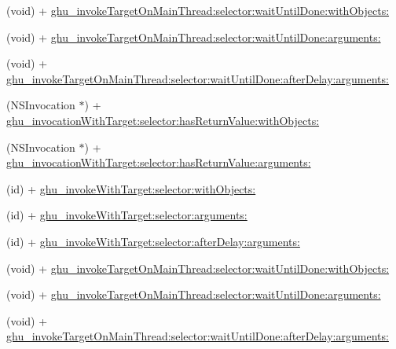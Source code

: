 \begin{DoxyCompactItemize}
(void) + \hyperlink{interface_n_s_invocation_07_g_h_utils___g_h_u_n_i_t_08_a6933a1f0fd7d0d4b8f133baf53f30a31}{ghu\-\_\-invoke\-Target\-On\-Main\-Thread\-:selector\-:wait\-Until\-Done\-:with\-Objects\-:}
\item 
(void) + \hyperlink{interface_n_s_invocation_07_g_h_utils___g_h_u_n_i_t_08_a261cd5aa6061478716fba4f79cb4f69b}{ghu\-\_\-invoke\-Target\-On\-Main\-Thread\-:selector\-:wait\-Until\-Done\-:arguments\-:}
\item 
(void) + \hyperlink{interface_n_s_invocation_07_g_h_utils___g_h_u_n_i_t_08_a0b891f27c084f6677907e0f907caf5f9}{ghu\-\_\-invoke\-Target\-On\-Main\-Thread\-:selector\-:wait\-Until\-Done\-:after\-Delay\-:arguments\-:}
\item 
(\-N\-S\-Invocation $\ast$) + \hyperlink{interface_n_s_invocation_07_g_h_utils___g_h_u_n_i_t_08_a31d3598ec7e21face3cb783c2c60b42c}{ghu\-\_\-invocation\-With\-Target\-:selector\-:has\-Return\-Value\-:with\-Objects\-:}
\item 
(\-N\-S\-Invocation $\ast$) + \hyperlink{interface_n_s_invocation_07_g_h_utils___g_h_u_n_i_t_08_a64dcd5d1f117118b02213db0846092d9}{ghu\-\_\-invocation\-With\-Target\-:selector\-:has\-Return\-Value\-:arguments\-:}
\item 
(id) + \hyperlink{interface_n_s_invocation_07_g_h_utils___g_h_u_n_i_t_08_af60de644c62297e237a21adf2ea75e80}{ghu\-\_\-invoke\-With\-Target\-:selector\-:with\-Objects\-:}
\item 
(id) + \hyperlink{interface_n_s_invocation_07_g_h_utils___g_h_u_n_i_t_08_a0aa9a0433b00c60a8174c7bed363821f}{ghu\-\_\-invoke\-With\-Target\-:selector\-:arguments\-:}
\item 
(id) + \hyperlink{interface_n_s_invocation_07_g_h_utils___g_h_u_n_i_t_08_a7f856b1af207762c610e597941411091}{ghu\-\_\-invoke\-With\-Target\-:selector\-:after\-Delay\-:arguments\-:}
\item 
(void) + \hyperlink{interface_n_s_invocation_07_g_h_utils___g_h_u_n_i_t_08_a6933a1f0fd7d0d4b8f133baf53f30a31}{ghu\-\_\-invoke\-Target\-On\-Main\-Thread\-:selector\-:wait\-Until\-Done\-:with\-Objects\-:}
\item 
(void) + \hyperlink{interface_n_s_invocation_07_g_h_utils___g_h_u_n_i_t_08_a261cd5aa6061478716fba4f79cb4f69b}{ghu\-\_\-invoke\-Target\-On\-Main\-Thread\-:selector\-:wait\-Until\-Done\-:arguments\-:}
\item 
(void) + \hyperlink{interface_n_s_invocation_07_g_h_utils___g_h_u_n_i_t_08_a0b891f27c084f6677907e0f907caf5f9}{ghu\-\_\-invoke\-Target\-On\-Main\-Thread\-:selector\-:wait\-Until\-Done\-:after\-Delay\-:arguments\-:}

\end{DoxyCompactItemize}
